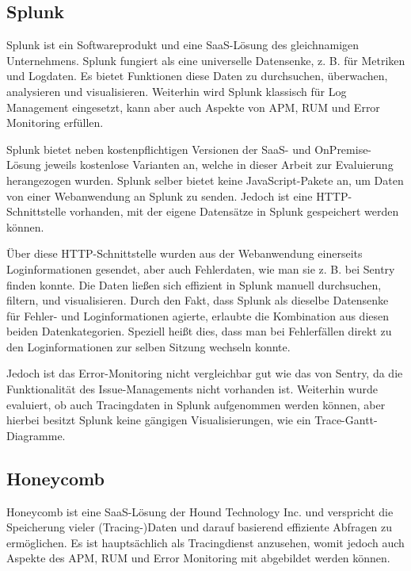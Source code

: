 \subsection{Splunk}

Splunk \cite{Splunk} ist ein Softwareprodukt und eine SaaS-Lösung des gleichnamigen Unternehmens. Splunk fungiert als eine universelle Datensenke, z. B. für Metriken und Logdaten. Es bietet Funktionen diese Daten zu durchsuchen, überwachen, analysieren und visualisieren. Weiterhin wird Splunk klassisch für Log Management eingesetzt, kann aber auch Aspekte von APM, RUM und Error Monitoring erfüllen.

Splunk bietet neben kostenpflichtigen Versionen der SaaS- und OnPremise-Lösung jeweils kostenlose Varianten an, welche in dieser Arbeit zur Evaluierung herangezogen wurden. Splunk selber bietet keine JavaScript-Pakete an, um Daten von einer Webanwendung an Splunk zu senden. Jedoch ist eine HTTP-Schnittstelle vorhanden, mit der eigene Datensätze in Splunk gespeichert werden können.

Über diese HTTP-Schnittstelle wurden aus der Webanwendung einerseits Loginformationen gesendet, aber auch Fehlerdaten, wie man sie z. B. bei Sentry finden konnte. Die Daten ließen sich effizient in Splunk manuell durchsuchen, filtern, und visualisieren. Durch den Fakt, dass Splunk als dieselbe Datensenke für Fehler- und Loginformationen agierte, erlaubte die Kombination aus diesen beiden Datenkategorien. Speziell heißt dies, dass man bei Fehlerfällen direkt zu den Loginformationen zur selben Sitzung wechseln konnte.

Jedoch ist das Error-Monitoring nicht vergleichbar gut wie das von Sentry, da die Funktionalität des Issue-Managements nicht vorhanden ist. Weiterhin wurde evaluiert, ob auch Tracingdaten in Splunk aufgenommen werden können, aber hierbei besitzt Splunk keine gängigen Visualisierungen, wie ein Trace-Gantt-Diagramme.

\subsection{Honeycomb}

Honeycomb \cite{Honeycomb} ist eine SaaS-Lösung der Hound Technology Inc. und verspricht die Speicherung vieler (Tracing-)Daten und darauf basierend effiziente Abfragen zu ermöglichen. Es ist hauptsächlich als Tracingdienst anzusehen, womit jedoch auch Aspekte des APM, RUM und Error Monitoring mit abgebildet werden können.

